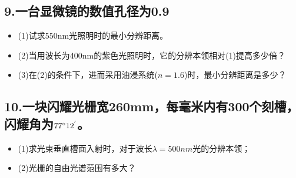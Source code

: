 \documentclass[11pt,a4paper]{article}
\begin{document}
    \subsection*{9.一台显微镜的数值孔径为0.9}
    \begin{itemize}
        \vspace{0mm}
        \item (1)试求550nm光照明时的最小分辨距离。
        \vspace{0mm}
        \item (2)当用波长为400nm的紫色光照明时，它的分辨本领相对(1)提高多少倍？
        \vspace{0mm}
        \item (3)在(2)的条件下，进而采用油浸系统($n=1.6$)时，最小分辨距离是多少？
    \end{itemize}
    \vspace{10mm}
    \subsection*{10.一块闪耀光栅宽260mm，每毫米内有300个刻槽，闪耀角为$77\degree12^{'}$。}
    \begin{itemize}
        \vspace{0mm}
        \item (1)求光束垂直槽面入射时，对于波长$\lambda =500nm$光的分辨本领；
        \vspace{0mm}
        \item (2)光栅的自由光谱范围有多大？
    \end{itemize}
    \vspace{10mm}
\end{document}
